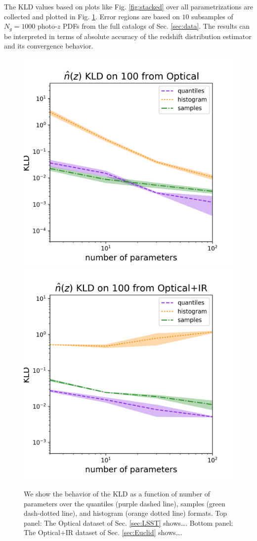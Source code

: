 \documentclass[\docopts]{\docclass}
\newcommand{\pz}{photo-$z$ PDF}
\begin{document}
The KLD values based on plots like Fig. \ref{fig:stacked} over all 
parametrizations are collected and plotted in Fig. \ref{fig:kld}.  Error 
regions are based on $10$ subsamples of $N_{g}=1000$ \pz s from the full 
catalogs of Sec. \ref{sec:data}.  The results can be interpreted in terms of 
absolute accuracy of the redshift distribution estimator and its convergence 
behavior.

\begin{figure}
  \includegraphics[width=0.9\columnwidth]{figures/lsst_kld.png}\\
  \includegraphics[width=0.9\columnwidth]{figures/euclid_kld.png}
  \caption{We show the behavior of the KLD as a function of number of 
parameters over the quantiles (purple dashed line), samples (green dash-dotted 
line), and histogram (orange dotted line) formats.  Top panel: The Optical 
dataset of Sec. \ref{sec:LSST} shows\dots.  Bottom panel: The Optical+IR 
dataset of Sec. \ref{sec:Euclid} shows\dots.
  \label{fig:kld}}
\end{figure}
\end{document}
